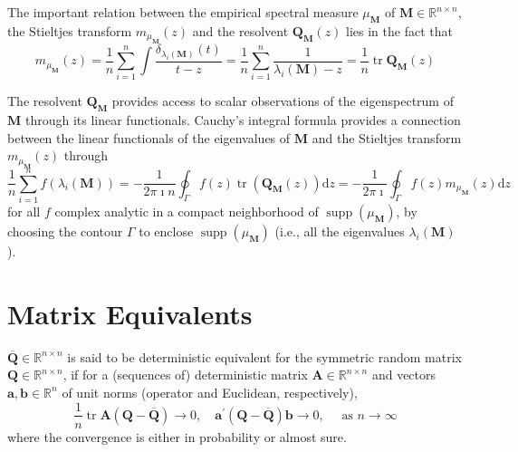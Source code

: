 \begin{remark}
    The important relation between the empirical spectral measure $\mu_{\mathbf{M}}$ of $\mathbf{M}\in\mathbb{R}^{n\times n}$, the Stieltjes transform $m_{\mu_{\mathbf{M}}}(z)$ and the resolvent $\mathbf{Q}_{\mathbf{M}}(z)$ lies in the fact that
    \begin{equation} \label{eq:relation-between-empirical-spectral-measures-stieltjes-transform-and-its-resolvent}
        m_{\mu_{\mathbf{M}}}(z)=\frac{1}{n}\sum_{i=1}^{n}\int\frac{\delta_{\lambda_{i}(\mathbf{M})}(t)}{t-z}=\frac{1}{n}\sum_{i=1}^{n}\frac{1}{\lambda_{i}(\mathbf{M})-z}=\frac{1}{n}\operatorname{tr}\mathbf{Q}_{\mathbf{M}}(z)
    \end{equation}
\end{remark}

The resolvent $\mathbf{Q}_{\mathbf{M}}$ provides access to scalar observations of the eigenspectrum of $\mathbf{M}$ through its linear functionals. Cauchy’s integral formula provides a connection between the linear functionals of the eigenvalues of $\mathbf{M}$ and the Stieltjes transform $m_{\mu_{\mathbf{M}}}(z)$ through
\begin{equation}
    \frac{1}{n}\sum_{i=1}^{n}f\left(\lambda_{i}(\mathbf{M})\right)=-\frac{1}{2\pi\imath n}\oint_{\Gamma}f(z)\operatorname{tr}\left(\mathbf{Q}_{\mathbf{M}}(z)\right)\mathrm{d}z=-\frac{1}{2\pi\imath }\oint_{\Gamma}f(z)m_{\mu_{\mathbf{M}}}(z)\mathrm{d}z
\end{equation}
for all $f$ complex analytic in a compact neighborhood of $\operatorname{supp}\left(\mu_{\mathbf{M}}\right)$, by choosing the contour $\Gamma$ to enclose $\operatorname{supp}\left(\mu_{\mathbf{M}}\right)$ (i.e., all the eigenvalues $\lambda_{i}(\mathbf{M})$).

\section{Matrix Equivalents}

\begin{definition}
    $\overline{\mathbf{Q}}\in\mathbb{R}^{n\times n}$ is said to be deterministic equivalent for the symmetric random matrix $\mathbf{Q}\in\mathbb{R}^{n\times n}$, if for a (sequences of) deterministic matrix $\mathbf{A}\in\mathbb{R}^{n\times n}$ and vectors $\mathbf{a},\mathbf{b}\in\mathbb{R}^{n}$ of unit norms (operator and Euclidean, respectively),
    \begin{equation}
        \frac{1}{n}\operatorname{tr}\mathbf{A}(\mathbf{Q}-\overline{\mathbf{Q}})\rightarrow 0,\quad\mathbf{a}^{\prime}(\mathbf{Q}-\overline{\mathbf{Q}})\mathbf{b}\rightarrow 0,\quad\text{ as }n\rightarrow\infty
    \end{equation}
    where the convergence is either in probability or almost sure.
\end{definition}

